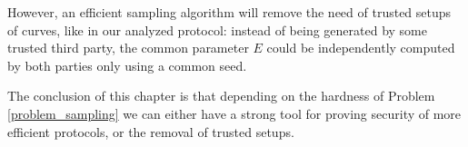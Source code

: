 However, an efficient sampling algorithm will remove the need of trusted setups of curves, like in our analyzed protocol: instead of being generated by some trusted third party, the common parameter $E$ could be independently computed by both parties only using a common seed.

The conclusion of this chapter is that depending on the hardness of Problem \ref{problem_sampling} we can either have a strong tool for proving security of more efficient protocols, or the removal of trusted setups.



